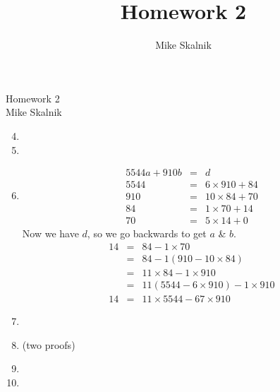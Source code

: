\documentclass[12pt]{article}
\title{Homework 2}
\author{Mike Skalnik}
\newcommand{\s}[1]{\setcounter{enumi}{#1}}
\begin{document}
\begin{flushright}{\large Homework 2\\ Mike Skalnik}\end{flushright}

\begin{enumerate}
  \s{3}
  
  \item 

  \item

  \item
    \begin{eqnarray*}
      5544a + 910b & = & d \\
      5544 & = & 6 \times 910 + 84 \\
      910 & = & 10 \times 84 + 70 \\
      84 & = & 1 \times 70 + 14 \\
      70 & = & 5 \times 14 + 0
    \end{eqnarray*}
    Now we have $d$, so we go backwards to get $a$ \& $b$.
    \begin{eqnarray*}
      14 & = & 84 - 1 \times 70 \\
      & = & 84 - 1 \left(910 - 10 \times 84\right) \\
      & = & 11 \times 84 - 1 \times 910 \\
      & = & 11 \left(5544 - 6 \times 910\right) - 1 \times 910 \\
      14 & = & 11 \times 5544 - 67 \times 910
    \end{eqnarray*}
  \s{8}
  
  \item

  \s{11}

  \item (two proofs)

  \s{15}

  \item

  \s{17}

  \item

\end{enumerate}
\end{document}
